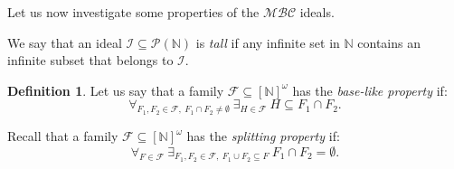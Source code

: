 \documentclass{amsart}
\theoremstyle{definition}
\newtheorem{df}[thm]{Definition}
\theoremstyle{definition}
\newcommand{\N}{{\mathbb N}}
\newcommand{\T}{\mathcal{T}}
\newcommand{\InfSubs}{[\N]^{\omega}}
\newcommand{\MBC}{\mathcal{MBC}}
\begin{document}



Let us now investigate some properties of the $\MBC$ ideals.

We say that an ideal $\mathcal{I}\subseteq\mathcal{P}(\N)$ is \emph{tall} if any infinite set in $\N$ contains an infinite subset that belongs to $\mathcal{I}$.


\begin{df}
Let us say that a family $\mathcal{F}\subseteq \InfSubs$ has the \emph{base-like property} if:
$$\forall_{F_1, F_2\in\mathcal{F},\ F_1\cap F_2\neq\emptyset}\ \exists_{H\in\mathcal{F}}\ H\subseteq F_1\cap F_2.$$
\end{df}

Recall that a family $\mathcal{F} \subseteq \InfSubs$ has the \emph{splitting property} if: 
$$\forall_{F\in\mathcal{F}}\ \exists_{F_1,F_2\in\mathcal{F},\ F_1\cup F_2 \subseteq F}\ F_1\cap F_2 = \emptyset.$$
\end{document}
